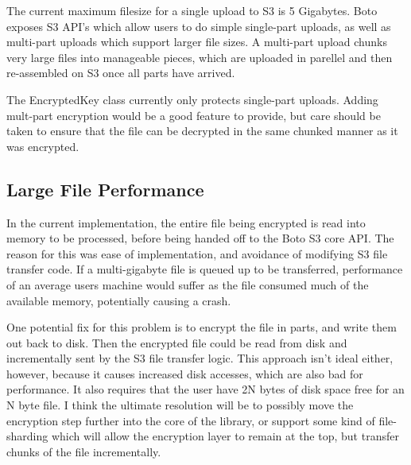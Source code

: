The current maximum filesize for a single upload to S3 is 5 Gigabytes. Boto exposes S3 API's which allow users to do simple
single-part uploads, as well as multi-part uploads which support larger file sizes. A multi-part upload chunks very large 
files into manageable pieces, which are uploaded in parellel and then re-assembled on S3 once all parts have arrived.

The EncryptedKey class currently only protects single-part uploads. Adding mult-part encryption would be a good feature
to provide, but care should be taken to ensure that the file can be decrypted in the same chunked manner as it was
encrypted.

\subsection{Large File Performance}

In the current implementation, the entire file being encrypted is read into memory to be processed, before being handed off
to the Boto S3 core API. The reason for this was ease of implementation, and avoidance of modifying S3 file transfer code.
If a multi-gigabyte file is queued up to be transferred, performance of an average users machine would suffer as the file 
consumed much of the available memory, potentially causing a crash.

One potential fix for this problem is to encrypt the file in parts, and write them out back to disk. Then the encrypted file could be read from disk and incrementally sent by the S3 file transfer logic. This approach isn't ideal either, however, because it causes
increased disk accesses, which are also bad for performance. It also requires that the user have 2N bytes of disk 
space free for an N byte file. I think the ultimate resolution will be to possibly move the encryption step further into the core
of the library, or support some kind of file-sharding which will allow the encryption layer to remain at the top, but transfer chunks of the file incrementally.
